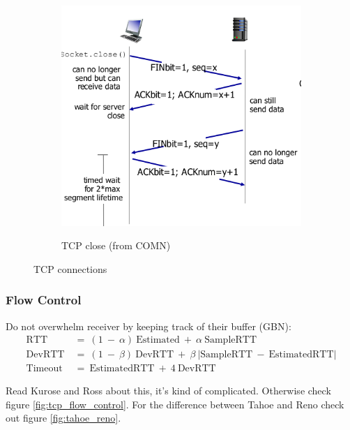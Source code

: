 \documentclass{article}
\begin{document}
\begin{figure}
\begin{subfigure}{0.55\textwidth}
        \includegraphics[width=\textwidth]{figures/tcp_close.png}
        \label{fig:tcp_close}
        \caption{TCP close (from COMN)}
    \end{subfigure}
    \caption{TCP connections}
    \label{fig:tcp_conns}
\end{figure}

\subsubsection{Flow Control}
Do not overwhelm receiver by keeping track of their buffer (GBN):
\begin{align*}
    \text{RTT}\ &=\ (1\ -\ \alpha)\ \text{Estimated}\ +\ \alpha\ \text{SampleRTT} \\
    \text{DevRTT}\ &=\ (1\ -\ \beta)\ \text{DevRTT}\ +\ \beta\ \left|\text{SampleRTT}\ -\ \text{EstimatedRTT}\right| \\
    \text{Timeout}\ &=\ \text{EstimatedRTT}\ +\ 4\ \text{DevRTT}
\end{align*}

Read Kurose and Ross about this, it's kind of complicated. Otherwise check figure \ref{fig:tcp_flow_control}. For the difference between Tahoe and Reno check out figure \ref{fig:tahoe_reno}.
\end{document}
